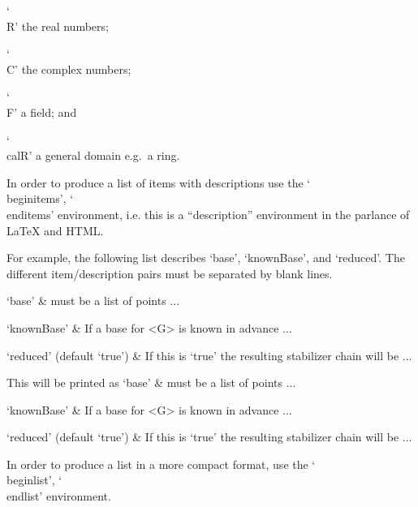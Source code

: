 \item{`\\R'}
the real numbers;

\item{`\\C'}
the complex numbers;

\item{`\\F'}
a field; and

\item{`\\calR'}
a general domain e.g.~a ring.

\endlist


\indextt{\\beginitems}\indextt{\\enditems}
In order  to   produce  a  list   of  items with   descriptions  use  the
`\\beginitems', `\\enditems' environment, i.e. this is a ``description''
environment in the parlance of La{\TeX} and HTML.

For example, the   following  list describes   `base', `knownBase',  and
`reduced'.
The different item/description pairs must be separated by blank lines.

\begintt
\beginitems
`base' &
    must be a  list of points ...

`knownBase' &
    If a base for <G> is known in advance ...

`reduced' (default `true') &
    If this is `true' the resulting stabilizer chain will be ...
\enditems
\endtt

This will be printed as
\beginitems
`base' &
    must be a  list of points ...

`knownBase' &
    If a base for <G> is known in advance ...

`reduced' (default `true') &
    If this is `true' the resulting stabilizer chain will be ...
\enditems

\indextt{\\beginlist}\indextt{\\endlist}\indextt{\\item}\indextt{\\itemitem}
In order to produce a list in a more compact format,
use the `\\beginlist', `\\endlist' environment.

